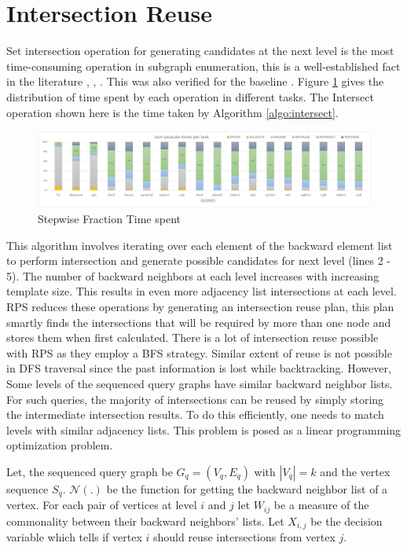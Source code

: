{\section{Intersection Reuse}\label{sec:reuse-impl}
Set intersection operation for generating candidates at the next level is the most time-consuming operation in subgraph enumeration, this is a well-established fact in the literature \cite{RPS-paper}, \cite{LIGHT}, \cite{VF3}.
This was also verified for the baseline \cite{PARSEC_VD}. Figure \ref{fig:time-dist} gives the distribution of time spent by each operation in different tasks. The Intersect operation shown here is the time taken by Algorithm \ref{algo:intersect}.
\begin{figure}
    \includegraphics[width=\textwidth]{fig/improvements/time-distributions-yt.png}
    \caption{Stepwise Fraction Time spent}
    \label{fig:time-dist}
\end{figure}
This algorithm involves iterating over each element of the backward element list to perform intersection and generate possible candidates for next level (lines 2 - 5).
The number of backward neighbors at each level increases with increasing template size. This results in even more adjacency list intersections at each level.
RPS \cite{RPS-paper} reduces these operations by generating an intersection reuse plan, this plan smartly finds the intersections that will be required by more than one node and stores them when first calculated. There is a lot of intersection reuse possible with RPS as they employ a BFS strategy.
Similar extent of reuse is not possible in DFS traversal since the past information is lost while backtracking.
However, Some levels of the sequenced query graphs have similar backward neighbor lists. For such queries, the majority of intersections can be reused by simply storing the intermediate intersection results.
To do this efficiently, one needs to match levels with similar adjacency lists. This problem is posed as a linear programming optimization problem.

Let, the sequenced query graph be $G_q=(V_q, E_q)$ with $|V_q|=k$ and the vertex sequence $S_q$.
$\mathcal{N}(.)$ be the function for getting the backward neighbor list of a vertex.
For each pair of vertices at level $i$ and $j$ let $W_{ij}$ be a measure of the commonality between their backward neighbors' lists. Let $X_{i,j}$ be the decision variable which tells if vertex $i$ should reuse intersections from vertex $j$.

}
